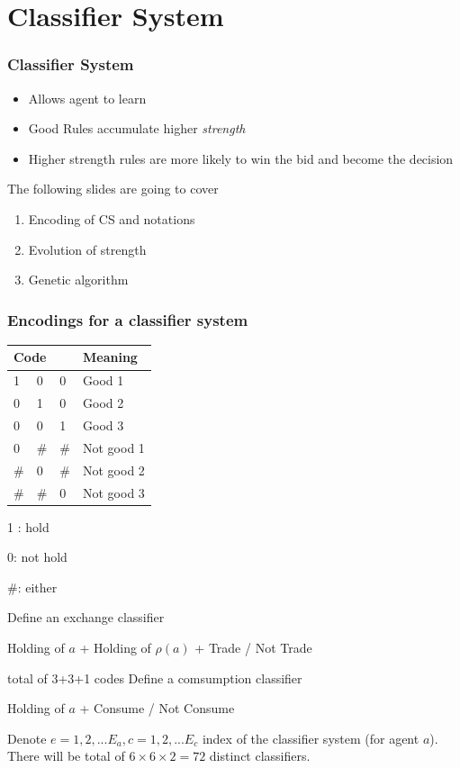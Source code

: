 \section{Classifier System}
\begin{frame}
    \frametitle{Classifier System}
    \begin{itemize}[<+->]
        \item Allows agent to learn
        \item Good Rules accumulate higher \emph{strength}
        \item Higher strength rules are more likely to win the bid and become the decision 
    \end{itemize}

    \vfill
    \pause
    The following slides are going to cover
    \begin{enumerate}[<+->]
        \item Encoding of CS and notations
        \item Evolution of strength
        \item Genetic algorithm
    \end{enumerate}
\end{frame}

\begin{frame}[allowframebreaks]
    \frametitle{Encodings for a classifier system}

    \begin{table}
        \begin{tabular}{llll}
            \hline
            \multicolumn{3}{l}{Code} & Meaning    \\ \hline
            1      & 0      & 0      & Good 1     \\
            0      & 1      & 0      & Good 2     \\
            0      & 0      & 1      & Good 3     \\
            0      & \#     & \#     & Not good 1 \\
            \#     & 0      & \#     & Not good 2 \\
            \#     & \#     & 0      & Not good 3 \\ \hline
            \end{tabular}
    \end{table}
    \vfill 
    1 : hold

    0: not hold

    \#: either

    \framebreak

    Define an exchange classifier
    \begin{center}
        Holding of $a$ + Holding of $\rho(a)$ + Trade / Not Trade
    \end{center}
    total of 3+3+1 codes
    \vfill
    \pause
    Define a comsumption classifier
    \begin{center}
        Holding of $a$ + Consume / Not Consume
    \end{center}

    \vfill
    \pause
    Denote $e=1,2,...E_a, c=1,2,...E_c$ index of the classifier system (for agent $a$).
    There will be total of $6\times 6 \times 2=72$ distinct classifiers.
\end{frame}

